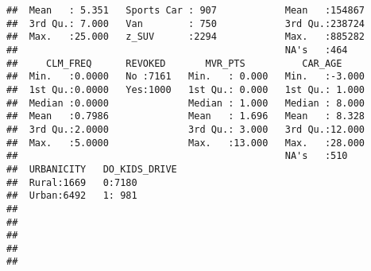 \documentclass[]{article}
\begin{document}
\begin{verbatim}
##  Mean   : 5.351   Sports Car : 907            Mean   :154867  
##  3rd Qu.: 7.000   Van        : 750            3rd Qu.:238724  
##  Max.   :25.000   z_SUV      :2294            Max.   :885282  
##                                               NA's   :464     
##     CLM_FREQ      REVOKED       MVR_PTS          CAR_AGE      
##  Min.   :0.0000   No :7161   Min.   : 0.000   Min.   :-3.000  
##  1st Qu.:0.0000   Yes:1000   1st Qu.: 0.000   1st Qu.: 1.000  
##  Median :0.0000              Median : 1.000   Median : 8.000  
##  Mean   :0.7986              Mean   : 1.696   Mean   : 8.328  
##  3rd Qu.:2.0000              3rd Qu.: 3.000   3rd Qu.:12.000  
##  Max.   :5.0000              Max.   :13.000   Max.   :28.000  
##                                               NA's   :510     
##  URBANICITY   DO_KIDS_DRIVE
##  Rural:1669   0:7180       
##  Urban:6492   1: 981       
##                            
##                            
##                            
##                            
## 
\end{verbatim}
\end{document}
